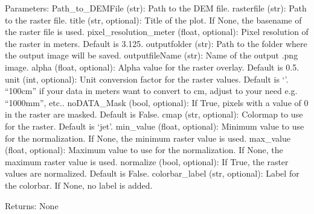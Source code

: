 \documentclass[letterpaper,10pt,english]{sphinxmanual}
\begin{document}
\begin{fulllineitems}
\sphinxAtStartPar
Parameters:
Path\_to\_DEMFile (str): Path to the DEM file.
rasterfile (str): Path to the raster file.
title (str, optional): Title of the plot. If None, the basename of the raster file is used.
pixel\_resolution\_meter (float, optional): Pixel resolution of the raster in meters. Default is 3.125.
outputfolder (str): Path to the folder where the output image will be saved.
outputfileName (str): Name of the output .png image.
alpha (float, optional): Alpha value for the raster overlay. Default is 0.5.
unit (int, optional): Unit conversion factor for the raster values. Default is ‘’. “100cm” if your data in meters want to convert to cm, adjust to your need e.g. “1000mm”, etc..
noDATA\_Mask (bool, optional): If True, pixels with a value of 0 in the raster are masked. Default is False.
cmap (str, optional): Colormap to use for the raster. Default is ‘jet’.
min\_value (float, optional): Minimum value to use for the normalization. If None, the minimum raster value is used.
max\_value (float, optional): Maximum value to use for the normalization. If None, the maximum raster value is used.
normalize (bool, optional): If True, the raster values are normalized. Default is False.
colorbar\_label (str, optional): Label for the colorbar. If None, no label is added.

\sphinxAtStartPar
Returns:
None

\end{fulllineitems}

\end{document}
